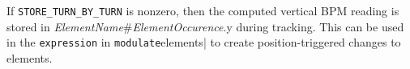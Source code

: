 If \verb|STORE_TURN_BY_TURN| is nonzero, then the computed vertical BPM reading is stored in
{\em ElementName}\#{\em ElementOccurence}.y during tracking.
This can be used in the \verb|expression| in \verb|modulate|elements| to create position-triggered
changes to elements.
